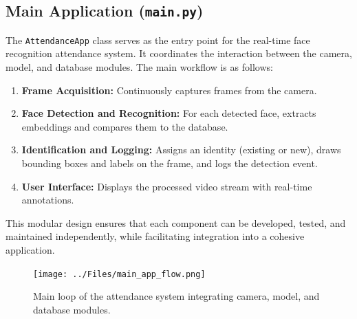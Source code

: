 \subsection{Main Application (\texttt{main.py})}
The \texttt{AttendanceApp} class serves as the entry point for the real-time face recognition attendance system. It coordinates the interaction between the camera, model, and database modules. The main workflow is as follows:
\begin{enumerate}
    \item \textbf{Frame Acquisition:} Continuously captures frames from the camera.
    \item \textbf{Face Detection and Recognition:} For each detected face, extracts embeddings and compares them to the database.
    \item \textbf{Identification and Logging:} Assigns an identity (existing or new), draws bounding boxes and labels on the frame, and logs the detection event.
    \item \textbf{User Interface:} Displays the processed video stream with real-time annotations.
\end{enumerate}

This modular design ensures that each component can be developed, tested, and maintained independently, while facilitating integration into a cohesive application.

\begin{figure}[ht!]
    \centering
    \texttt{[image: ../Files/main\_app\_flow.png]}
    \caption{Main loop of the attendance system integrating camera, model, and database modules.}
    \label{fig:main-app-flow}
\end{figure}

